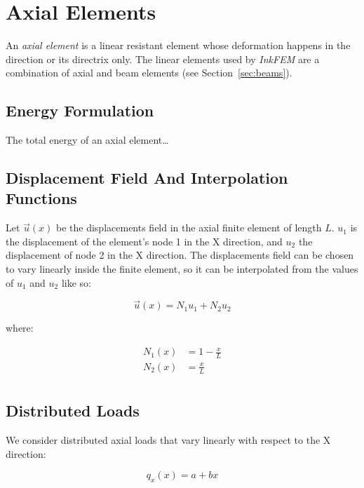 \section{Axial Elements}
\label{sec:axial}

An \emph{axial element} is a linear resistant element whose deformation happens in the direction or its directrix only.
The linear elements used by \emph{InkFEM} are a combination of axial and beam elements (see Section~\ref{sec:beams}).


\subsection{Energy Formulation}

The total energy of an axial element\dots

\subsection{Displacement Field And Interpolation Functions}

Let $\vec{u}(x)$ be the displacements field in the axial finite element of length $L$.
$u_1$ is the displacement of the element's node 1 in the X direction, and $u_2$ the displacement of node 2 in the X direction.
The displacements field can be chosen to vary linearly inside the finite element, so it can be interpolated from the values of $u_1$ and $u_2$ like so:

\begin{equation}
  \vec{u}(x) = N_1 u_1 + N_2 u_2
\end{equation}

where:

\begin{equation}
  \begin{split}
    N_1(x) & = 1 - \frac{x}{L} \\
    N_2(x) & = \frac{x}{L} \\
  \end{split}
\end{equation}


\subsection{Distributed Loads}

We consider distributed axial loads that vary linearly with respect to the X direction:

\begin{equation}
  q_x(x) = a + bx
\end{equation}

